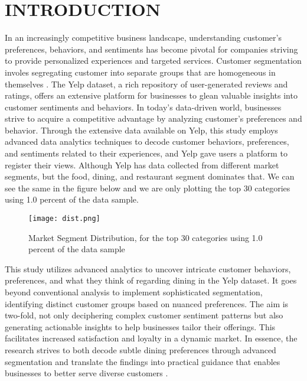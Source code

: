 \documentclass[conference]{IEEEtran}
\begin{document}

\section{INTRODUCTION}
In an increasingly competitive business landscape, understanding customer's preferences, behaviors, and sentiments has become pivotal for companies striving to provide personalized experiences and targeted services. Customer segmentation involes segregating customer into separate groups that are homogeneous in themselves \cite{tsiptsis}. The Yelp dataset, a rich repository of user-generated reviews and ratings, offers an extensive platform for businesses to glean valuable insights into customer sentiments and behaviors. In today's data-driven world, businesses strive to acquire a competitive advantage by analyzing customer's preferences and behavior. Through the extensive data available on Yelp, this study employs advanced data analytics techniques to decode customer behaviors, preferences, and sentiments related to their experiences, and Yelp gave users a platform to register their views. Although Yelp has data collected from different market segments, but the food, dining, and restaurant segment dominates that. We can see the same in the figure below and we are only plotting the top 30 categories using 1.0 percent of the data sample.

\begin{figure}
   \centering
  \texttt{[image: dist.png]}
  \caption{Market Segment Distribution, for the top 30 categories using 1.0 percent of the data sample}
\end{figure}


This study utilizes advanced analytics to uncover intricate customer behaviors, preferences, and what they think of regarding dining in the Yelp dataset. It goes beyond conventional analysis to implement sophisticated segmentation, identifying distinct customer groups based on nuanced preferences. The aim is two-fold, not only deciphering complex customer sentiment patterns but also generating actionable insights to help businesses tailor their offerings. This facilitates increased satisfaction and loyalty in a dynamic market. In essence, the research strives to both decode subtle dining preferences through advanced segmentation and translate the findings into practical guidance that enables businesses to better serve diverse customers \cite{business_needs}.
\end{document}

